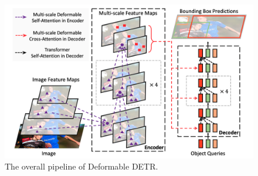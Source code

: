 \documentclass[10pt,twocolumn,letterpaper]{article}
\begin{document}
\begin{figure}[t]
    \includegraphics[width=\linewidth]{assets/deformable_detr.png}
    \caption{\label{fig:overview}The overall pipeline of Deformable DETR.}
\end{figure}



{\small


}
\end{document}
